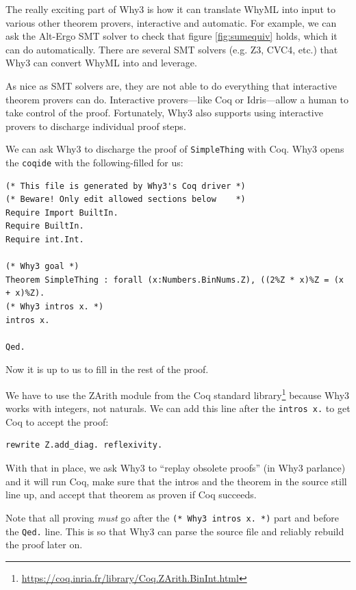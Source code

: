 \documentclass[12pt]{article}
\begin{document}
The really exciting part of Why3 is how it can translate WhyML into input to various other theorem provers, interactive and automatic.
For example, we can ask the Alt-Ergo SMT solver to check that figure \ref{fig:sumequiv} holds, which it can do automatically.
There are several SMT solvers (e.g. Z3, CVC4, etc.) that Why3 can convert WhyML into and leverage.


As nice as SMT solvers are, they are not able to do everything that interactive theorem provers can do.
Interactive provers---like Coq or Idris---allow a human to take control of the proof.
Fortunately, Why3 also supports using interactive provers to discharge individual proof steps.

We can ask Why3 to discharge the proof of \texttt{SimpleThing} with Coq.
Why3 opens the \texttt{coqide} with the following-filled for us:

\begin{verbatim}
(* This file is generated by Why3's Coq driver *)
(* Beware! Only edit allowed sections below    *)
Require Import BuiltIn.
Require BuiltIn.
Require int.Int.

(* Why3 goal *)
Theorem SimpleThing : forall (x:Numbers.BinNums.Z), ((2%Z * x)%Z = (x + x)%Z).
(* Why3 intros x. *)
intros x.

Qed.
\end{verbatim}

Now it is up to us to fill in the rest of the proof.

We have to use the ZArith module from the Coq standard library\footnote{\url{https://coq.inria.fr/library/Coq.ZArith.BinInt.html}} because Why3 works with integers, not naturals.
We can add this line after the \texttt{intros x.} to get Coq to accept the proof:

\begin{verbatim}
rewrite Z.add_diag. reflexivity.
\end{verbatim}

With that in place, we ask Why3 to ``replay obsolete proofs'' (in Why3 parlance) and it will run Coq, make sure that the intros and the theorem in the source still line up, and accept that theorem as proven if Coq succeeds.

Note that all proving \emph{must} go after the \texttt{(* Why3 intros x. *)} part and before the \texttt{Qed.} line.
This is so that Why3 can parse the source file and reliably rebuild the proof later on.
\end{document}
